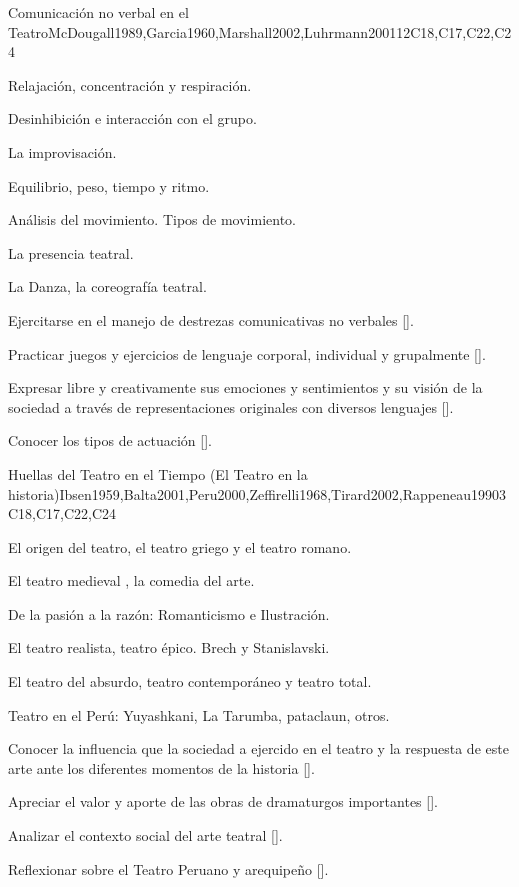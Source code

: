 \begin{syllabus}
\begin{unit}{}{Comunicación no verbal en el Teatro}{McDougall1989,Garcia1960,Marshall2002,Luhrmann2001}{12}{C18,C17,C22,C24}
\begin{topics}
	\item Relajación, concentración y respiración.
	\item Desinhibición e interacción con el grupo.
	\item La improvisación. 
	\item Equilibrio, peso, tiempo y ritmo. 
	\item Análisis del movimiento. Tipos de movimiento.
	\item La presencia teatral.
	\item La Danza, la coreografía teatral.     
\end{topics}
\begin{learningoutcomes}
	\item Ejercitarse en el manejo de destrezas comunicativas no verbales [\Usage].
	\item Practicar juegos y ejercicios de lenguaje  corporal, individual y grupalmente [\Usage].
	\item Expresar libre y creativamente sus emociones y sentimientos y su visión de la sociedad  a través de representaciones originales con diversos lenguajes [\Usage].
	\item Conocer los tipos de actuación [\Usage].
\end{learningoutcomes}
\end{unit}

\begin{unit}{}{Huellas del Teatro en el Tiempo  (El Teatro en la historia)}{Ibsen1959,Balta2001,Peru2000,Zeffirelli1968,Tirard2002,Rappeneau1990}{3}{C18,C17,C22,C24}
\begin{topics}
	\item El origen del teatro, el teatro griego y el teatro romano.
	\item El teatro medieval , la comedia del arte.
	\item De la pasión a la razón: Romanticismo e Ilustración.
	\item El teatro realista, teatro épico. Brech  y  Stanislavski.
	\item El teatro del absurdo, teatro contemporáneo y teatro total.
	\item Teatro en el Perú: Yuyashkani, La Tarumba, pataclaun, otros.
\end{topics}
\begin{learningoutcomes}
	\item Conocer la influencia que la sociedad a ejercido en el teatro y la respuesta de este arte ante los diferentes momentos de la historia [\Usage].
	\item Apreciar el valor y aporte de las obras de dramaturgos importantes [\Usage].
	\item Analizar el contexto social del arte teatral [\Usage].
	\item Reflexionar sobre el Teatro Peruano y arequipeño [\Usage].
\end{learningoutcomes}
\end{unit}


\end{syllabus}
